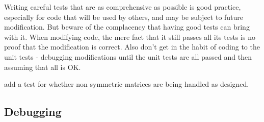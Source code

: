 \documentclass[10pt] {article}
\theoremstyle{definition}
\begin{document}
Writing careful tests that are as comprehensive as possible is good practice, especially for code that will be used by others, and may be subject to future modification. But beware of the complacency that having good tests can bring with it. When modifying code, the mere fact that it still passes all its tests is no proof that the modification is correct. Also don't get in the habit of coding to the unit tests - debugging modifications until the unit tests are all passed and then assuming that all is OK. 

\bigskip

 add a test for whether non symmetric matrices are being handled as designed.

\subsection{Debugging}
\end{document}
